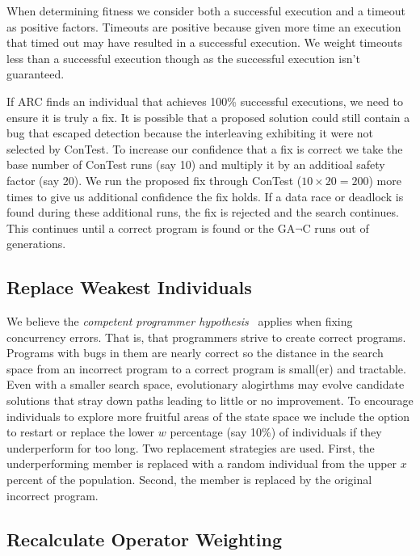 \documentclass[runningheads,a4paper]{llncs}
\begin{document}
\noindent When determining fitness we consider both a successful execution and a timeout as positive factors. Timeouts are positive because given more time an execution that timed out may have resulted in a successful execution. We weight timeouts less than a successful execution though as the successful execution isn't guaranteed.

If ARC finds an individual that achieves 100\% successful executions, we need to ensure it is truly a fix. It is possible that a proposed solution could still contain a bug that escaped detection because the interleaving exhibiting it were not selected by ConTest. To increase our confidence that a fix is correct we take the base number of ConTest runs (say 10) and multiply it by an additioal safety factor (say 20). We run the proposed fix through ConTest ($10 \times 20 = 200$) more times to give us additional confidence the fix holds.  If a data race or deadlock is found during these additional runs, the fix is rejected and the search continues. This continues until a correct program is found or the GA$\neg$C runs out of generations.

\subsection{Replace Weakest Individuals}
\label{sec:replace_weakest_individuals}

We believe the \textit{competent programmer hypothesis}~\cite{ABD+79} applies when fixing concurrency errors.  That is, that programmers strive to create correct programs.  Programs with bugs in them are nearly correct so the distance in the search space from an incorrect program to a correct program is small(er) and tractable.  Even with a smaller search space, evolutionary alogirthms may evolve candidate solutions that stray down paths leading to little or no improvement. To encourage individuals to explore more fruitful areas of the state space we include the option to restart or replace the lower $w$ percentage (say 10\%) of individuals if they underperform for too long.  Two replacement strategies are used. First, the underperforming member is replaced with a random individual from the upper $x$ percent of the population. Second, the member is replaced by the original incorrect program.

\subsection{Recalculate Operator Weighting}
\label{sec:recalculate_operator_weighting}
\end{document}
